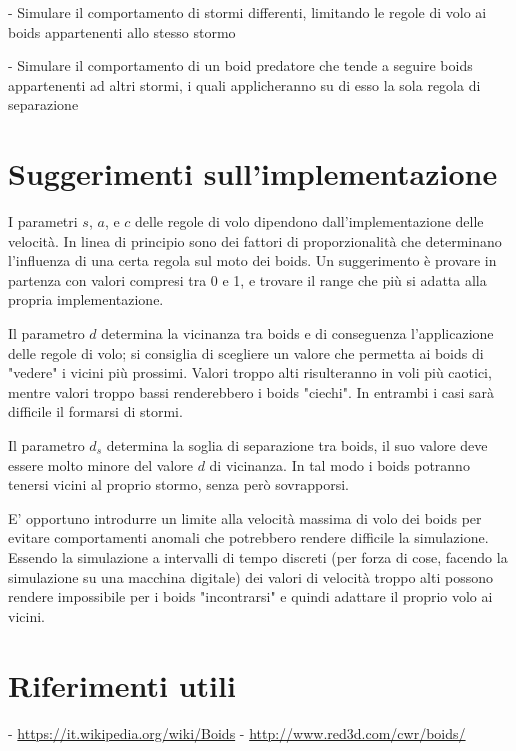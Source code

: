 \documentclass[]{article}
\begin{document}
- Simulare il comportamento di stormi differenti, limitando le regole di volo ai boids appartenenti allo stesso stormo

- Simulare il comportamento di un boid predatore che tende a seguire boids appartenenti ad altri stormi, i quali applicheranno su di esso la sola regola di separazione

\section{Suggerimenti sull'implementazione}

I parametri $s$, $a$, e $c$ delle regole di volo dipendono dall'implementazione delle velocità. In linea di principio
sono dei fattori di proporzionalità che determinano l'influenza di una certa regola sul moto dei boids. Un suggerimento
è provare in partenza con valori compresi tra 0 e 1, e trovare il range che più si adatta alla propria implementazione.

Il parametro $d$ determina la vicinanza tra boids e di conseguenza l'applicazione delle regole di volo; si consiglia di
scegliere un valore che permetta ai boids di "vedere" i vicini più prossimi. Valori troppo alti risulteranno in voli più
caotici, mentre valori troppo bassi renderebbero i boids "ciechi". In entrambi i casi sarà difficile il formarsi di
stormi.

Il parametro $d_s$ determina la soglia di separazione tra boids, il suo valore deve essere molto minore del valore $d$
di vicinanza. In tal modo i boids potranno tenersi vicini al proprio stormo, senza però sovrapporsi.

E' opportuno introdurre un limite alla velocità massima di volo dei boids per evitare comportamenti anomali che
potrebbero rendere difficile la simulazione. Essendo la simulazione a intervalli di tempo discreti (per forza di cose,
facendo la simulazione su una macchina digitale) dei valori di velocità troppo alti possono rendere impossibile per i
boids "incontrarsi" e quindi adattare il proprio volo ai vicini.

\section{Riferimenti utili}

- \href{Boids - wikipedia}{https://it.wikipedia.org/wiki/Boids}
- \href{Pagina di Craig Raynolds sui boids}{http://www.red3d.com/cwr/boids/}
\end{document}
